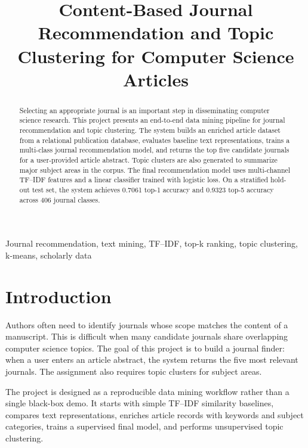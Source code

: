 \documentclass[conference]{IEEEtran}
\begin{document}
\title{Content-Based Journal Recommendation and Topic Clustering for Computer Science Articles}

\author{
}

\maketitle

\begin{abstract}
Selecting an appropriate journal is an important step in disseminating computer science research. This project presents an end-to-end data mining pipeline for journal recommendation and topic clustering. The system builds an enriched article dataset from a relational publication database, evaluates baseline text representations, trains a multi-class journal recommendation model, and returns the top five candidate journals for a user-provided article abstract. Topic clusters are also generated to summarize major subject areas in the corpus. The final recommendation model uses multi-channel TF--IDF features and a linear classifier trained with logistic loss. On a stratified hold-out test set, the system achieves 0.7061 top-1 accuracy and 0.9323 top-5 accuracy across 406 journal classes.
\end{abstract}

\begin{IEEEkeywords}
Journal recommendation, text mining, TF--IDF, top-k ranking, topic clustering, k-means, scholarly data
\end{IEEEkeywords}

\section{Introduction}
Authors often need to identify journals whose scope matches the content of a manuscript. This is difficult when many candidate journals share overlapping computer science topics. The goal of this project is to build a journal finder: when a user enters an article abstract, the system returns the five most relevant journals. The assignment also requires topic clusters for subject areas.

The project is designed as a reproducible data mining workflow rather than a single black-box demo. It starts with simple TF--IDF similarity baselines, compares text representations, enriches article records with keywords and subject categories, trains a supervised final model, and performs unsupervised topic clustering.
\end{document}
